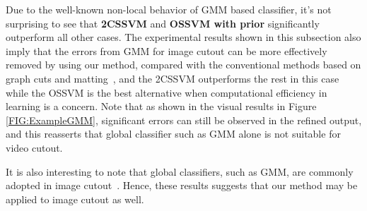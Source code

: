 \documentclass[10pt,journal,compsoc]{newIEEEtran}
\begin{document}
Due to the well-known non-local behavior of GMM based classifier, it's not surprising to see that \textbf{2CSSVM} and \textbf{OSSVM with prior} significantly outperform all other cases. The experimental results shown in this subsection also imply that the errors from GMM for image cutout can be more effectively removed by using our method, compared with the conventional methods based on graph cuts and matting~\cite{Rother04GrabCut,BoykovJolly01GMM-MRF}, and the 2CSSVM outperforms the rest in this case while the OSSVM is the best alternative when computational efficiency in learning is a concern. Note that as shown in the visual results in Figure \ref{FIG:ExampleGMM}, significant errors can still be observed in the refined output, and this reasserts that global classifier such as GMM alone is not suitable for video cutout.
\iffalse\begin{figure}[!h]
	\centering
	\texttt{[image: imgs/plots/GMM\_plot.jpg]}\\
	\caption{Effectiveness of our data-driven video cutout rectification on GMM classifier.}\label{FIG:RstRectfyGMM}
\end{figure}\fi

It is also interesting to note that global classifiers, such as GMM, are commonly adopted in image cutout~\cite{Rother04GrabCut,BoykovJolly01GMM-MRF}. Hence, these results suggests that our method may be applied to image cutout as well.
\end{document}
